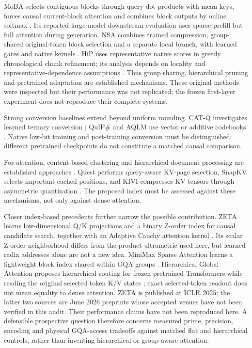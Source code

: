 \documentclass[11pt]{article}
\begin{document}
MoBA selects contiguous blocks through query dot products with mean keys,
forces causal current-block attention and combines block outputs by online
softmax \citep{lu2025moba}. Its reported large-model downstream evaluation
uses sparse prefill but full attention during generation. NSA combines
trained compression, group-shared original-token block selection and a
separate local branch, with learned gates and native kernels
\citep{yuan2025nsa}. HiP uses representative native scores in greedy
chronological chunk refinement; its analysis depends on locality and
representative-dependence assumptions \citep{lee2025hip}. Thus group sharing,
hierarchical pruning and pretrained adaptation are established mechanisms.
These original methods were inspected but their performance was not replicated;
the frozen first-layer experiment does not reproduce their complete systems.

Strong conversion baselines extend beyond uniform rounding.
CAT-Q investigates learned ternary conversion \citep{wang2026catq}; QuIP\#
and AQLM use vector or additive codebooks \citep{tseng2024quip,egiazarian2024aqlm}.
Native low-bit training and post-training conversion must be distinguished:
different pretrained checkpoints do not constitute a matched causal comparison.

For attention, content-based clustering and hierarchical document processing
are established approaches \citep{roy2021routing,he2024hdt}.
Quest performs query-aware KV-page selection, SnapKV selects important cached
positions, and KIVI compresses KV tensors through asymmetric quantization
\citep{tang2024quest,li2024snapkv,liu2024kivi}. The proposed index must be assessed
against these mechanisms, not only against dense attention.

Closer index-based precedents further narrow the possible contribution.
ZETA learns low-dimensional Q/K projections and a binary Z-order index for
causal candidate search, together with an Adaptive Cauchy attention kernel
\citep{zeng2025zeta}. Its scalar Z-order neighborhood differs from the product
ultrametric used here, but learned radix addresses alone are not a new idea.
MiniMax Sparse Attention learns a lightweight block index shared within GQA
groups \citep{lai2026msa}. Hierarchical Global Attention proposes hierarchical
routing for frozen pretrained Transformers while reading the original selected
token K/V states \citep{hga2026routing}; exact selected-token readout does not
mean equality to dense attention. ZETA is published at ICLR 2025; the latter
two sources are June 2026 preprints whose accepted venues have not been verified
in this audit. Their performance claims have not been reproduced here.
A defensible prospective question therefore concerns measured prime, precision,
encoding and physical GQA-access tradeoffs against matched flat and hierarchical
controls, rather than inventing hierarchical or group-aware attention.
\end{document}
